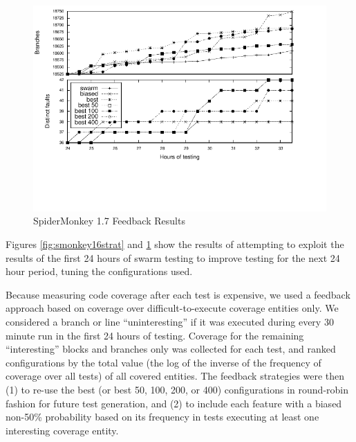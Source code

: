 \begin{figure}
  \centering
  \includegraphics[width=\textwidth]{../graphs/SpiderMonkey/js17strats}
  \vspace{-1.5in}
  \caption{SpiderMonkey 1.7 Feedback Results}
  \label{fig:smonkey17strat}
\end{figure}

Figures \ref{fig:smonkey16strat} and \ref{fig:smonkey17strat} show the
results of attempting to exploit the results of the first 24 hours of
swarm testing to improve testing for the next 24 hour period, tuning
the configurations used.  

Because measuring code coverage after each test is expensive, we used
a feedback approach based on coverage over difficult-to-execute
coverage entities only.  We considered a branch or line
``uninteresting'' if it was executed during every 30 minute run in the
first 24 hours of testing.  Coverage for the remaining ``interesting''
blocks and branches only was collected for each test, and
ranked configurations by the total value (the log of the inverse of
the frequency of coverage over all tests) of all covered entities.
The feedback strategies were then (1) to re-use the best (or best 50,
100, 200, or 400) configurations in round-robin fashion for future
test generation, and (2) to include each feature with a biased
non-50\% probability based on its frequency in tests executing at least
one interesting coverage entity.

